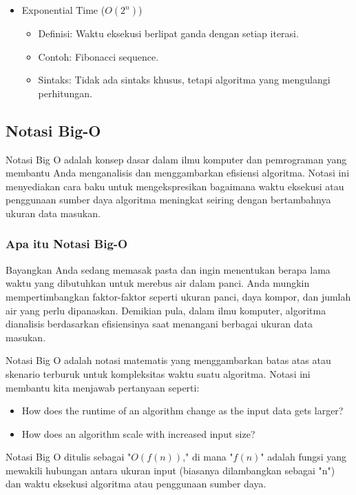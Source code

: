 \documentclass{article}
\begin{document}
\begin{itemize}
\begin{itemize}
\begin{lstlisting}[language=Python, caption={}, captionpos=b]
for i in range(n):
    for j in range(n):
        # kode
\end{lstlisting}
          \end{itemize}
    \item Exponential Time (\(O(2^n)\))
          \begin{itemize}
              \item Definisi: Waktu eksekusi berlipat ganda dengan setiap iterasi.
              \item Contoh: Fibonacci sequence.
              \item Sintaks: Tidak ada sintaks khusus, tetapi algoritma yang mengulangi perhitungan.
          \end{itemize}
\end{itemize}

\subsection{Notasi Big-O}
Notasi Big O adalah konsep dasar dalam ilmu komputer dan pemrograman yang membantu Anda menganalisis dan menggambarkan efisiensi algoritma. Notasi ini menyediakan cara baku untuk mengekspresikan bagaimana waktu eksekusi atau penggunaan sumber daya algoritma meningkat seiring dengan bertambahnya ukuran data masukan.

\subsubsection{Apa itu Notasi Big-O}
Bayangkan Anda sedang memasak pasta dan ingin menentukan berapa lama waktu yang dibutuhkan untuk merebus air dalam panci. Anda mungkin mempertimbangkan faktor-faktor seperti ukuran panci, daya kompor, dan jumlah air yang perlu dipanaskan. Demikian pula, dalam ilmu komputer, algoritma dianalisis berdasarkan efisiensinya saat menangani berbagai ukuran data masukan.


Notasi Big O adalah notasi matematis yang menggambarkan batas atas atau skenario terburuk untuk kompleksitas waktu suatu algoritma. Notasi ini membantu kita menjawab pertanyaan seperti:
\begin{itemize}
    \item How does the runtime of an algorithm change as the input data gets larger?
    \item How does an algorithm scale with increased input size?
\end{itemize}

Notasi Big O ditulis sebagai "\(O(f(n))\)," di mana "\(f(n)\)" adalah fungsi yang mewakili hubungan antara ukuran input (biasanya dilambangkan sebagai "n") dan waktu eksekusi algoritma atau penggunaan sumber daya.
\end{document}
